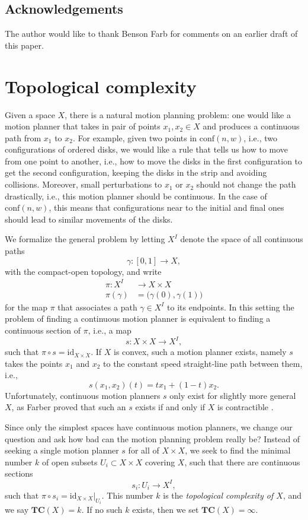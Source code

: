 \documentclass[pagebackref,colorlinks,citecolor=blue,linkcolor=blue,urlcolor=blue,filecolor=blue]{article}
\theoremstyle{definition}\newtheorem{definition}[thm]{Definition}
\theoremstyle{definition}
\begin{document}
\subsection{Acknowledgements}
The author would like to thank Benson Farb for comments on an earlier draft of this paper.

\section{Topological complexity}
Given a space $X$, there is a natural motion planning problem: one would like a motion planner that takes in pair of points $x_{1}, x_{2}\in X$ and produces a continuous path from $x_{1}$ to $x_{2}$.
For example, given two points in $\text{conf}(n,w)$, i.e., two configurations of ordered disks, we would like a rule that tells us how to move from one point to another, i.e., how to move the disks in the first configuration to get the second configuration, keeping the disks in the strip and avoiding collisions.
Moreover, small perturbations to $x_{1}$ or $x_{2}$ should not change the path drastically, i.e., this motion planner should be continuous.
In the case of $\text{conf}(n,w)$, this means that configurations near to the initial and final ones should lead to similar movements of the disks.

We formalize the general problem by letting $X^{I}$ denote the space of all continuous paths 
\[
\gamma:[0,1]\to X,
\]
with the compact-open topology, and write
\begin{align*}
\pi:X^{I}&\to X\times X\\
\pi(\gamma)&=\big(\gamma(0), \gamma(1)\big)
\end{align*}
for the map $\pi$ that associates a path $\gamma\in X^{I}$ to its endpoints.
In this setting the problem of finding a continuous motion planner is equivalent to finding a continuous section of $\pi$, i.e., a map
\[
s:X\times X\to X^{I},
\]
such that $\pi\circ s=\text{id}_{X\times X}$.
If $X$ is convex, such a motion planner exists, namely $s$ takes the points $x_{1}$ and $x_{2}$ to the constant speed straight-line path between them, i.e.,
\[
s(x_{1}, x_{2})(t)=tx_{1}+(1-t)x_{2}.
\]
Unfortunately, continuous motion planners $s$ only exist for slightly more general $X$, as Farber proved that such an $s$ exists if and only if $X$ is contractible \cite[Theorem 1]{farber2003topological}.

Since only the simplest spaces have continuous motion planners, we change our question and ask how bad can the motion planning problem really be?
Instead of seeking a single motion planner $s$ for all of $X\times X$, we seek to find the minimal number $k$ of open subsets $U_{i}\subset X\times X$ covering $X$, such that there are continuous sections
\[
s_{i}:U_{i}\to X^{I},
\]
such that $\pi\circ s_{i}=\text{id}_{X\times X}|_{U_{i}}$.
This number $k$ is the \emph{topological complexity of $X$}, and we say $\textbf{TC}(X)=k$.
If no such $k$ exists, then we set $\textbf{TC}(X)=\infty$.
\end{document}
